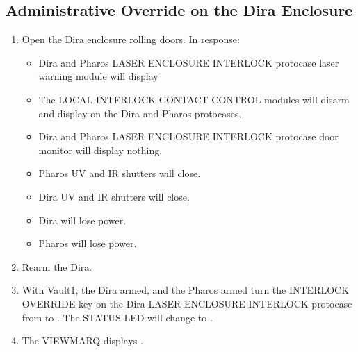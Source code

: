\documentclass[letterpaper,10pt,english]{sphinxmanual}
\begin{document}
\subsection{Administrative Override on the Dira Enclosure}
\label{\detokenize{testing_documentation/Vault-1_laser:administrative-override-on-the-dira-enclosure}}\begin{enumerate}
%
\item {} 
\sphinxAtStartPar
Open the Dira enclosure rolling doors.
In response:
\begin{itemize}
\item {} 
\sphinxAtStartPar
Dira and Pharos LASER ENCLOSURE INTERLOCK protocase laser warning module will display 

\item {} 
\sphinxAtStartPar
The LOCAL INTERLOCK CONTACT CONTROL modules will disarm and display  on the Dira and Pharos protocases.

\item {} 
\sphinxAtStartPar
Dira and Pharos LASER ENCLOSURE INTERLOCK protocase door monitor will display nothing.

\item {} 
\sphinxAtStartPar
Pharos UV and IR shutters will close.

\item {} 
\sphinxAtStartPar
Dira UV and IR shutters will close.

\item {} 
\sphinxAtStartPar
Dira will lose power.

\item {} 
\sphinxAtStartPar
Pharos will lose power.

\end{itemize}

\item {} 
\sphinxAtStartPar
Rearm the Dira.

\item {} 
\sphinxAtStartPar
With Vault\sphinxhyphen{}1, the Dira armed, and the Pharos armed turn the INTERLOCK OVERRIDE key on the Dira LASER ENCLOSURE INTERLOCK protocase from  to .
The STATUS LED will change to .

\item {} 
\sphinxAtStartPar
The VIEWMARQ displays .


\end{enumerate}
\end{document}
